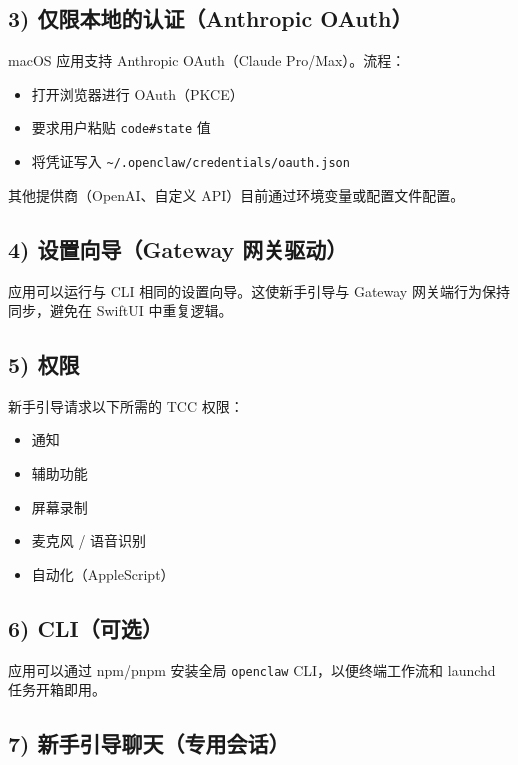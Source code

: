 \subsection{3) 仅限本地的认证（Anthropic OAuth）}


macOS 应用支持 Anthropic OAuth（Claude Pro/Max）。流程：

\begin{itemize}
  \item 打开浏览器进行 OAuth（PKCE）
  \item 要求用户粘贴 \texttt{code\#state} 值
  \item 将凭证写入 \texttt{\textasciitilde{}/.openclaw/credentials/oauth.json}
\end{itemize}


其他提供商（OpenAI、自定义 API）目前通过环境变量或配置文件配置。

\subsection{4) 设置向导（Gateway 网关驱动）}


应用可以运行与 CLI 相同的设置向导。这使新手引导与 Gateway 网关端行为保持同步，避免在 SwiftUI 中重复逻辑。

\subsection{5) 权限}


新手引导请求以下所需的 TCC 权限：

\begin{itemize}
  \item 通知
  \item 辅助功能
  \item 屏幕录制
  \item 麦克风 / 语音识别
  \item 自动化（AppleScript）
\end{itemize}


\subsection{6) CLI（可选）}


应用可以通过 npm/pnpm 安装全局 \texttt{openclaw} CLI，以便终端工作流和 launchd 任务开箱即用。

\subsection{7) 新手引导聊天（专用会话）}


